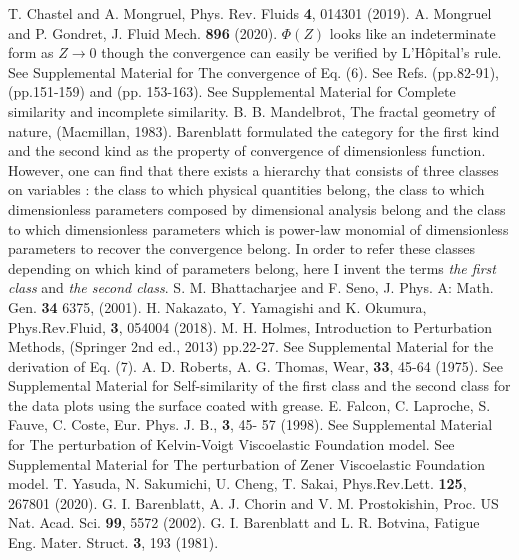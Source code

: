 \documentclass[default,iicol,10pt]{sn-jnl}%
\theoremstyle{thmstyleone}%
\theoremstyle{thmstyletwo}%
\theoremstyle{thmstylethree}%
\begin{document}
\begin{thebibliography}{99}
T. Chastel and A. Mongruel, Phys. Rev. Fluids {\bf4}, 014301 (2019).
A. Mongruel and P. Gondret, J. Fluid Mech. {\bf 896} (2020).
$\Phi(Z)$ looks like an indeterminate form as $Z \rightarrow 0$ though the convergence can easily be verified by L'H{\^{o}}pital's rule. See Supplemental Material for The convergence of Eq. (6).
See Refs. \cite{Barenblatt2003} (pp.82-91), \cite{Barenblatt1996} (pp.151-159) and \cite{Barenblatt2014} (pp. 153-163). See Supplemental Material for Complete similarity and incomplete similarity.
B. B. Mandelbrot, The fractal geometry of nature, (Macmillan, 1983).
Barenblatt formulated the category for the first kind and the second kind as the property of convergence of dimensionless function. However, one can find that there exists a hierarchy that consists of three classes on variables : the class to which physical quantities belong, the class to which dimensionless parameters composed by dimensional analysis belong and the class to which dimensionless parameters which is power-law monomial of dimensionless parameters to recover the convergence belong. In order to refer these classes depending on which kind of parameters belong, here I invent the terms {\it the first class} and {\it the second class}.
S. M. Bhattacharjee and F. Seno, J. Phys. A: Math. Gen. {\bf34} 6375, (2001).
H. Nakazato, Y. Yamagishi and K. Okumura, Phys.Rev.Fluid, {\bf 3}, 054004 (2018). 
M. H. Holmes, Introduction to Perturbation Methods, (Springer 2nd ed., 2013) pp.22-27.
See Supplemental Material for the derivation of Eq. (7).
A. D. Roberts, A. G. Thomas, Wear, {\bf 33}, 45-64 (1975).
See Supplemental Material for Self-similarity of the first class and the second class for the data plots using the surface coated with grease.
E. Falcon, C. Laproche, S. Fauve, C. Coste, Eur. Phys. J. B., {\bf 3}, 45- 57 (1998).
See Supplemental Material for The perturbation of Kelvin-Voigt Viscoelastic Foundation model.
See Supplemental Material for The perturbation of Zener Viscoelastic Foundation model.
T. Yasuda, N. Sakumichi, U. Cheng, T. Sakai, Phys.Rev.Lett. {\bf 125}, 267801 (2020).
G. I. Barenblatt, A. J. Chorin and V. M. Prostokishin, Proc. US Nat. Acad. Sci. {\bf 99}, 5572 (2002).
G. I. Barenblatt and L. R. Botvina, Fatigue Eng. Mater. Struct. {\bf 3}, 193 (1981).


\end{thebibliography}
\end{document}
